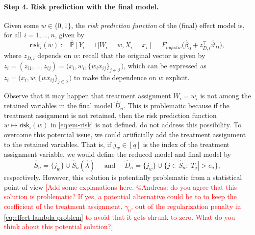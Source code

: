 \documentclass[11pt]{article}
\renewcommand{\P}{\mathbb{P}}
\begin{document}
\paragraph{Step 4. Risk prediction with the final model.}
Given some $w \in \{0,1\}$, the \textit{risk prediction function} of the (final) effect model is, for all $i=1,\dots,n$, given by
\begin{equation}\label{eq:em-risk}
    \textsf{risk}_i(w)
    :=
    \widehat{\P}[Y_i=1 | W_i = w, X_i = x_i] 
    =
    F_{logistic}\Big(\widehat{\beta}_0 +
    z_{D,i}^\top \widehat{\vartheta}_{D}\Big), 
\end{equation}
where $z_{D,i}$ depends on $w$: recall that the original vector is given by $z_i = (z_{i1},\dots, z_{ij}) = \big(x_i, w_i, \{ w_i x_{ij} \}_{j\in\mathcal{I}}\big)$, which can be expressed as $z_i = \big(x_i, w, \{ w x_{ij} \}_{j\in\mathcal{I}}\big)$ to make the dependence on $w$ explicit.

Observe that it may happen that treatment assignment $W_i = w_i$ is not among the retained variables in the final model $\widehat{D}_n$. This is problematic because if the treatment assignment is not retained, then the risk prediction function $w \mapsto \textsf{risk}_i(w)$ in \eqref{eq:em-risk} is not defined. \cite{kent2020path} do not address this possibility. To overcome this potential issue, we could artificially add the treatment assignment to the retained variables. That is, if $j_w\in[q]$ is the index of the treatment assignment variable, we would define the reduced model and final model by
\[
    \widehat{S}_n = \{j_w\} \cup \widehat{S}_n(\widehat{\lambda})
    \quad \text{ and } \quad
    \widehat{D}_n =  \{j_w\} \cup \Big\{ j\in\widehat{S}_n : |T_j| > c_n \Big\},
\]
respectively. However, this solution is potentially problematic from a statistical point of view \textcolor{red}{[Add some explanations here. @Andreas: do you agree that this solution is problematic? If yes, a potential alternative could be to to keep the coefficient of the treatment assignment, $\gamma_0$, out of the regularization penalty in \eqref{eq:effect-lambda-problem} to avoid that it gets shrunk to zero. What do you think about this potential solution?]}
\end{document}
